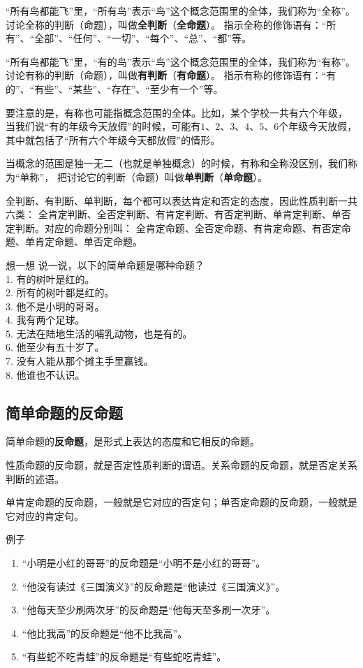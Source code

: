 \documentclass[12pt,UTF8,a4paper]{article}
\begin{document}
“所有鸟都能飞”里，“所有鸟”表示“鸟”这个概念范围里的全体，我们称为“全称”。
讨论全称的判断（命题），叫做\textbf{全判断}（\textbf{全命题}）。
指示全称的修饰语有：“所有”、“全部”、“任何”、“一切”、“每个”、“总”、“都”等。

“所有鸟都能飞”里，“有的鸟”表示“鸟”这个概念范围里的全体，我们称为“有称”。
讨论有称的判断（命题），叫做\textbf{有判断}（\textbf{有命题}）。
指示有称的修饰语有：“有的”、“有些”、“某些”、“存在”、“至少有一个”等。

要注意的是，有称也可能指概念范围的全体。比如，某个学校一共有六个年级，
当我们说“有的年级今天放假”的时候，可能有$1$、$2$、$3$、$4$、$5$、$6$个年级今天放假，
其中就包括了“所有六个年级今天都放假”的情形。

当概念的范围是独一无二（也就是单独概念）的时候，有称和全称没区别，我们称为“单称”，
把讨论它的判断（命题）叫做\textbf{单判断}（\textbf{单命题}）。

全判断、有判断、单判断，每个都可以表达肯定和否定的态度，因此性质判断一共六类：
全肯定判断、全否定判断、有肯定判断、有否定判断、单肯定判断、单否定判断。对应的命题分别叫：
全肯定命题、全否定命题、有肯定命题、有否定命题、单肯定命题、单否定命题。

\begin{blockaft}{想一想}
    说一说，以下的简单命题是哪种命题？\\
    1. 有的树叶是红的。 \\
    2. 所有的树叶都是红的。\\
    3. 他不是小明的哥哥。\\
    4. 我有两个足球。 \\
    5. 无法在陆地生活的哺乳动物，也是有的。\\
    6. 他至少有五十岁了。\\
    7. 没有人能从那个摊主手里赢钱。 \\
    8. 他谁也不认识。
\end{blockaft}

\subsection{简单命题的反命题}

简单命题的\textbf{反命题}，是形式上表达的态度和它相反的命题。

性质命题的反命题，就是否定性质判断的谓语。关系命题的反命题，就是否定关系判断的述语。

单肯定命题的反命题，一般就是它对应的否定句；单否定命题的反命题，一般就是它对应的肯定句。

\begin{blockin}{例子}
    \begin{enumerate}
        \item “小明是小红的哥哥”的反命题是“小明不是小红的哥哥”。
        \item “他没有读过《三国演义》”的反命题是“他读过《三国演义》”。
        \item “他每天至少刷两次牙”的反命题是“他每天至多刷一次牙”。
        \item “他比我高”的反命题是“他不比我高”。
        \item “有些蛇不吃青蛙”的反命题是“有些蛇吃青蛙”。
    \end{enumerate}
\end{blockin}
\end{document}
